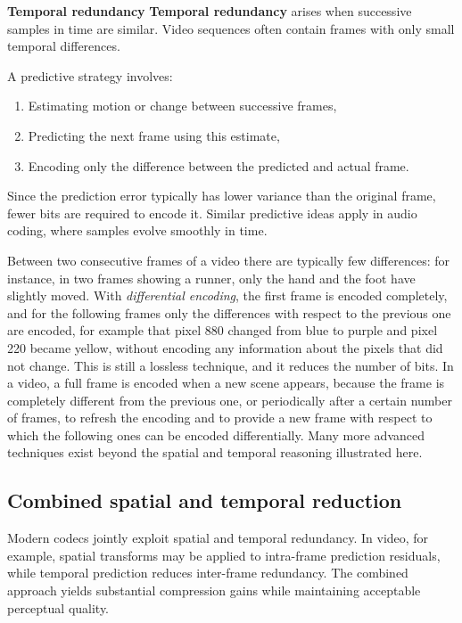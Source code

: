 \textbf{Temporal redundancy} \textbf{Temporal redundancy} arises when successive samples in time are similar. Video sequences often contain frames with only small temporal differences.

A predictive strategy involves:

\begin{enumerate}
\item Estimating motion or change between successive frames,
\item Predicting the next frame using this estimate,
\item Encoding only the difference between the predicted and actual frame.
\end{enumerate}

Since the prediction error typically has lower variance than the original frame, fewer bits are required to encode it. Similar predictive ideas apply in audio coding, where samples evolve smoothly in time.

Between two consecutive frames of a video there are typically few differences: for instance, in two frames showing a runner, only the hand and the foot have slightly moved. With \emph{differential encoding}, the first frame is encoded completely, and for the following frames only the differences with respect to the previous one are encoded, for example that pixel 880 changed from blue to purple and pixel 220 became yellow, without encoding any information about the pixels that did not change. This is still a lossless technique, and it reduces the number of bits. In a video, a full frame is encoded when a new scene appears, because the frame is completely different from the previous one, or periodically after a certain number of frames, to refresh the encoding and to provide a new frame with respect to which the following ones can be encoded differentially. Many more advanced techniques exist beyond the spatial and temporal reasoning illustrated here.

\subsection{Combined spatial and temporal reduction}

Modern codecs jointly exploit spatial and temporal redundancy. In video, for example, spatial transforms may be applied to intra-frame prediction residuals, while temporal prediction reduces inter-frame redundancy. The combined approach yields substantial compression gains while maintaining acceptable perceptual quality.

